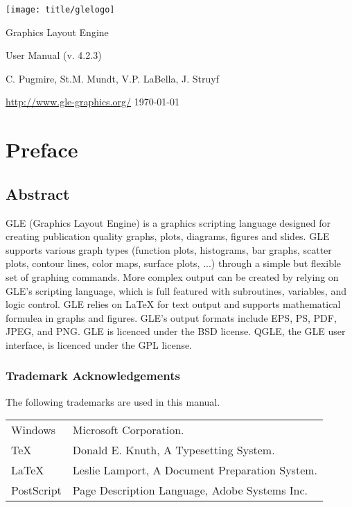 \thispagestyle{empty}
\begin{center}
\texttt{[image: title/glelogo]}

{\Huge Graphics Layout Engine}

\vspace{1cm}

{\huge User Manual (v. 4.2.3)}

\vspace{1cm}

C. Pugmire, St.M. Mundt, V.P. LaBella, J. Struyf

\vspace{1cm}

\url{http://www.gle-graphics.org/}
\vfill
\today{}
\end{center}


\tableofcontents

\chapter{Preface}

\section*{Abstract}

GLE (Graphics Layout Engine) is a graphics scripting language designed for creating publication quality graphs, plots, diagrams, figures and slides. GLE supports various graph types (function plots, histograms, bar graphs, scatter plots, contour lines, color maps, surface plots, ...) through a simple but flexible set of graphing commands. More complex output can be created by relying on GLE's scripting language, which is full featured with subroutines, variables, and logic control. GLE relies on \LaTeX{} for text output and supports mathematical formulea in graphs and figures. GLE's output formats include EPS, PS, PDF, JPEG, and PNG. GLE is licenced under the BSD license. QGLE, the GLE user interface, is licenced under the GPL license.

\subsection*{Trademark Acknowledgements}
The following trademarks are used in this manual.

\begin{tabular}{ll} %
{Windows}	& Microsoft Corporation.\\
{\TeX}		& Donald E. Knuth, A Typesetting System.\\
{\LaTeX}	& Leslie Lamport, A Document Preparation System.\\
{PostScript}	& Page Description Language, Adobe Systems Inc.\\
\end{tabular}


